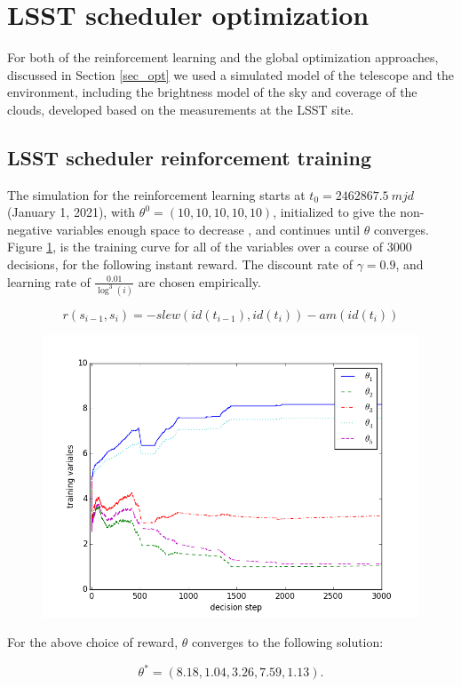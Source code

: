 \documentclass[12pt,aas_macros]{article}
\theoremstyle{definition}
\begin{document}
\section{LSST scheduler optimization}\label{sec_lsst_opt}

For both of the reinforcement learning and the global optimization approaches, discussed in Section \ref{sec_opt} we used a simulated model of the telescope and the environment, including the brightness model of the sky and coverage of the clouds, developed based on the measurements at the LSST site. 


\subsection{LSST scheduler reinforcement training}

The simulation for the reinforcement learning starts at $t_0 = 2462867.5~mjd$ (January 1, 2021), with $\theta^0 = (10,10,10,10,10)$, initialized to give the non-negative variables enough space to decrease , and continues until $\theta$ converges. Figure \ref{fig_theta_conv}, is the training curve for all of the variables over a course of 3000 decisions, for the following instant reward. The discount rate of $\gamma = 0.9$, and learning rate of $\frac{0.01}{\log^3(i)}$ are chosen empirically. 

\begin{equation}
r(s_{i-1}, s_i) = -slew(id(t_{i-1}), id(t_{i})) - am(id(t_i))
\end{equation}

\begin{figure}[h!]
\begin{center}
\includegraphics[width=0.4\linewidth]{TDcurve.png}
\end{center}
\caption{}
\label{fig_theta_conv}
\end{figure}

For the above choice of reward, $\theta$ converges to the following solution:

\begin{equation*}
\theta^* = (8.18,  1.04,  3.26,  7.59,  1.13).
\end{equation*}
\end{document}
